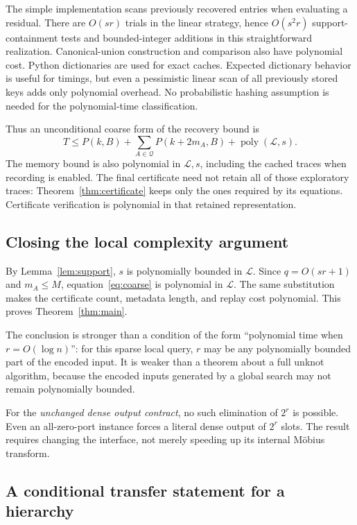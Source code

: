 \documentclass[11pt,letterpaper]{article}
\theoremstyle{definition}\newtheorem{definition}[theorem]{Definition}
\theoremstyle{remark}\newtheorem{remark}[theorem]{Remark}
\newcommand{\poly}{\operatorname{poly}}
\newcommand{\calQ}{\mathcal{Q}}
\begin{document}
The simple implementation scans previously recovered entries when evaluating a residual. There are $O(sr)$ trials in the linear strategy, hence $O(s^2r)$ support-containment tests and bounded-integer additions in this straightforward realization. Canonical-union construction and comparison also have polynomial cost. Python dictionaries are used for exact caches. Expected dictionary behavior is useful for timings, but even a pessimistic linear scan of all previously stored keys adds only polynomial overhead. No probabilistic hashing assumption is needed for the polynomial-time classification.

Thus an unconditional coarse form of the recovery bound is
\begin{equation}
T\le P(k,B)+\sum_{A\in\calQ}P(k+2m_A,B)
      +\poly(\mathcal L,s).
\label{eq:coarse}
\end{equation}
The memory bound is also polynomial in $\mathcal L,s$, including the cached traces when recording is enabled. The final certificate need not retain all of those exploratory traces: Theorem~\ref{thm:certificate} keeps only the ones required by its equations. Certificate verification is polynomial in that retained representation.

\subsection{Closing the local complexity argument}

By Lemma~\ref{lem:support}, $s$ is polynomially bounded in $\mathcal L$. Since $q=O(sr+1)$ and $m_A\le M$, equation~\eqref{eq:coarse} is polynomial in $\mathcal L$. The same substitution makes the certificate count, metadata length, and replay cost polynomial. This proves Theorem~\ref{thm:main}.

The conclusion is stronger than a condition of the form ``polynomial time when $r=O(\log n)$'': for this sparse local query, $r$ may be any polynomially bounded part of the encoded input. It is weaker than a theorem about a full unknot algorithm, because the encoded inputs generated by a global search may not remain polynomially bounded.

For the \emph{unchanged dense output contract}, no such elimination of $2^r$ is possible. Even an all-zero-port instance forces a literal dense output of $2^r$ slots. The result requires changing the interface, not merely speeding up its internal M\"obius transform.

\subsection{A conditional transfer statement for a hierarchy}
\end{document}
